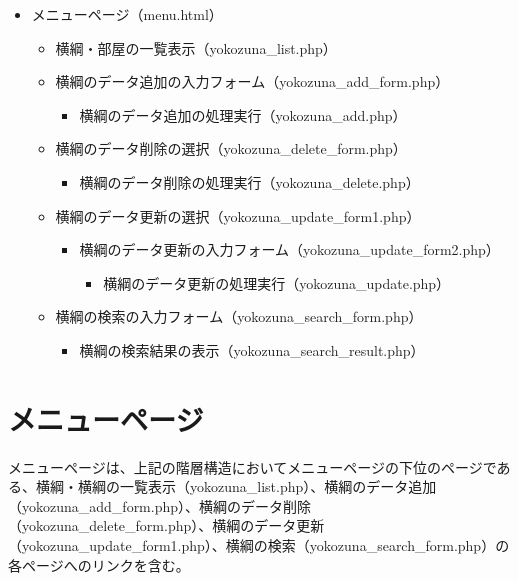\documentclass[10pt,a4paper,titlepage]{jreport}
\begin{document}
\begin{itemize}
\item メニューページ（menu.html）
	\begin{itemize}
	\item 横綱・部屋の一覧表示（yokozuna\_list.php）
	\item 横綱のデータ追加の入力フォーム（yokozuna\_add\_form.php）
		\begin{itemize}
			\item 横綱のデータ追加の処理実行（yokozuna\_add.php）
		\end{itemize}
	\item 横綱のデータ削除の選択（yokozuna\_delete\_form.php）
		\begin{itemize}
			\item 横綱のデータ削除の処理実行（yokozuna\_delete.php）
		\end{itemize}
	\item 横綱のデータ更新の選択（yokozuna\_update\_form1.php）
		\begin{itemize}
			\item 横綱のデータ更新の入力フォーム（yokozuna\_update\_form2.php）
			\begin{itemize}
				\item 横綱のデータ更新の処理実行（yokozuna\_update.php）
			\end{itemize}
		\end{itemize}
	\item 横綱の検索の入力フォーム（yokozuna\_search\_form.php）
		\begin{itemize}
			\item 横綱の検索結果の表示（yokozuna\_search\_result.php）
		\end{itemize}
	\end{itemize}
\end{itemize}


\section{メニューページ}

メニューページは、上記の階層構造においてメニューページの下位のページである、横綱・横綱の一覧表示（yokozuna\_list.php）、横綱のデータ追加（yokozuna\_add\_form.php）、横綱のデータ削除（yokozuna\_delete\_form.php）、横綱のデータ更新（yokozuna\_update\_form1.php）、横綱の検索（yokozuna\_search\_form.php）の各ページへのリンクを含む。


\end{document}
